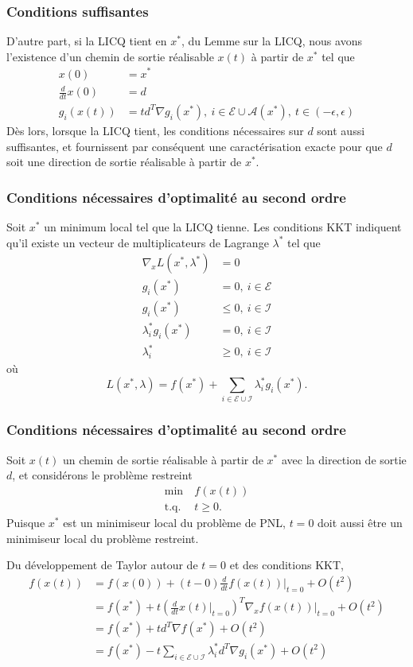 \documentclass[usepdftitle=false]{beamer}
\def\cA{\mathcal{A}}
\def\cE{\mathcal{E}}
\def\cI{\mathcal{I}}
\begin{document}

\begin{frame}
\frametitle{Conditions suffisantes}

D'autre part, si la LICQ tient en $x^*$, du Lemme sur la LICQ, nous avons l'existence d'un chemin de sortie réalisable $x(t)$ à partir de $x^*$ tel que
\begin{align*}
x(0) &= x^* \\
\frac{d}{dt} x(0) &= d \\
g_i(x(t)) &= td^T\nabla g_i(x^*),\ i \in \cE \cup \cA(x^*),\ t \in (-\epsilon, \epsilon)
\end{align*}
Dès lors, lorsque la LICQ tient, les conditions nécessaires sur $d$ sont aussi suffisantes, et fournissent par conséquent une caractérisation exacte pour que $d$ soit une direction de sortie réalisable à partir de $x^*$.

\end{frame}

\begin{frame}
\frametitle{Conditions nécessaires d'optimalité au second ordre}

Soit $x^*$ un minimum local tel que la LICQ tienne.
Les conditions KKT indiquent qu'il existe un vecteur de multiplicateurs de Lagrange $\lambda^*$ tel que
\begin{align*}
\nabla_x L(x^*,\lambda^*) &= 0 \\
g_i(x^*) &= 0,\ i \in \cE \\
g_i(x^*) &\leq 0,\ i \in \cI \\
\lambda_i^* g_i(x^*) &= 0,\ i \in \cI \\
\lambda_i^* &\geq 0,\ i \in \cI
\end{align*}
où
$$
L(x^*, \lambda) = f(x^*) + \sum_{i \in \cE \cup \cI} \lambda_i^* g_i(x^*).
$$

\end{frame}

\begin{frame}
\frametitle{Conditions nécessaires d'optimalité au second ordre}

Soit $x(t)$ un chemin de sortie réalisable à partir de $x^*$ avec la direction de sortie $d$, et considérons le problème restreint
\begin{align*}
\min\ & f(x(t)) \\
\mbox{t.q. } & t \geq 0.
\end{align*} 
Puisque $x^*$ est un minimiseur local du problème de PNL, $t = 0$ doit aussi être un minimiseur local du problème restreint.

Du développement de Taylor autour de $t = 0$ et des conditions KKT,
\begin{align*}
f(x(t)) &= f(x(0)) + (t-0) \frac{d}{dt} f(x(t)) |_{t=0} + O(t^2) \\
&= f(x^*) + t\left(\frac{d}{dt}x(t)|_{t=0}\right)^T \nabla_x f(x(t))|_{t=0} + O(t^2) \\
&= f(x^*) + td^T \nabla f(x^*) + O(t^2) \\
&= f(x^*) - t \sum_{i \in \cE \cup \cI} \lambda_i^* d^T \nabla g_i(x^*) + O(t^2)
\end{align*}

\end{frame}
\end{document}
